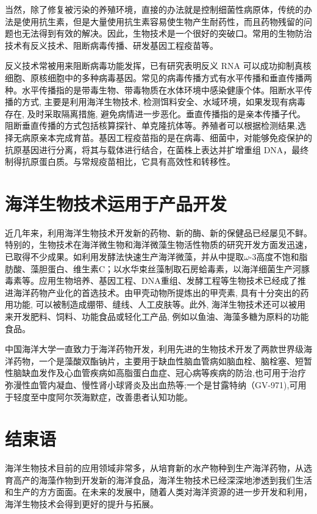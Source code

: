 \documentclass[a4paper,twocolumn]{ctexart}
\begin{document}
当然，除了修复被污染的养殖环境，直接的办法就是控制细菌性病原体，传统的办法是使用抗生素，但是大量使用抗生素容易使生物产生耐药性，而且药物残留的问题也无法得到有效的解决。因此，生物技术是一个很好的突破口。常用的生物防治技术有反义技术、阻断病毒传播、研发基因工程疫苗等。

反义技术常被用来阻断病毒功能发挥，已有研究表明反义 RNA 可以成功抑制真核细胞、原核细胞中的多种病毒基因。常见的病毒传播方式有水平传播和垂直传播两种。水平传播指的是带毒生物、带毒物质在水体环境中感染健康个体。阻断水平传播的方式, 主要是利用海洋生物技术, 检测饵料安全、水域环境，如果发现有病毒存在, 及时采取隔离措施, 避免病情进一步恶化。垂直传播指的是亲本传播子代。阻断垂直传播的方式包括核算探针、单克隆抗体等。养殖者可以根据检测结果,选择无病原亲本完成育苗\cite{奚根金2015水稻栽培技术研究}。基因工程疫苗指的是在病毒、细菌中，对能够免疫保护的抗原基因进行分离，将其与载体进行结合，在菌株上表达并扩增重组 DNA，最终制得抗原蛋白质。与常规疫苗相比，它具有高效性和转移性。

\section{海洋生物技术运用于产品开发}
近几年来，利用海洋生物技术开发新的药物、新的酶、新的保健品已经屡见不鲜。特别的，生物技术在海洋微生物和海洋微藻生物活性物质的研究开发方面发迅速，已取得不少成果。如利用发酵法快速生产海洋微藻，并从中提取$\omega$-3高度不饱和脂肪酸、藻胆蛋白、维生素C；以水华束丝藻制取石房蛤毒素，以海洋细菌生产河豚毒素等。应用生物培养、基因工程、DNA重组、发酵工程等生物技术已经成了推进海洋药物产业化的首选技术\cite{黄美珍2002海洋药物开发与生物技术}。由甲壳动物所提炼出的甲壳素, 具有十分突出的药用功能, 可以被制造成绷带、缝线、人工皮肤等。此外, 海洋生物技术还可以被用来开发肥料、饲料、功能食品或轻化工产品, 例如以鱼油、海藻多糖为原料的功能食品。

中国海洋大学一直致力于海洋药物开发，利用先进的生物技术开发了两款世界级海洋药物，一个是藻酸双酯钠片，主要用于缺血性脑血管病如脑血栓、脑栓塞、短暂性脑缺血发作及心血管疾病如高脂蛋白血症、冠心病等疾病的防治,也可用于治疗弥漫性血管内凝血、慢性肾小球肾炎及出血热等;一个是甘露特纳（GV-971),可用于轻度至中度阿尔茨海默症，改善患者认知功能。

\section*{结束语}
海洋生物技术目前的应用领域非常多，从培育新的水产物种到生产海洋药物，从选育高产的海藻作物到开发新的海洋食品，海洋生物技术已经深深地渗透到我们生活和生产的方方面面。在未来的发展中，随着人类对海洋资源的进一步开发和利用，海洋生物技术会得到更好的提升与拓展。



\end{document}
